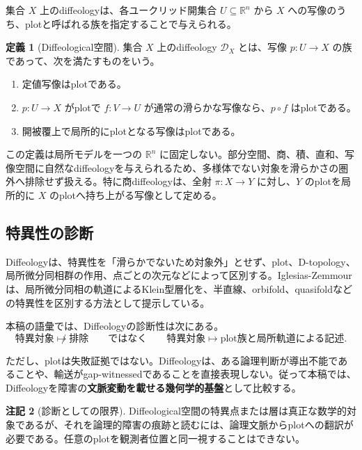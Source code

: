 \documentclass[a4paper,11pt]{ltjsarticle}
\theoremstyle{definition}
\newtheorem{definition}{定義}[section]
\newtheorem{remark}[definition]{注記}
\theoremstyle{plain}
\begin{document}
集合 $X$ 上のdiffeologyは、各ユークリッド開集合 $U\subseteq\mathbb R^n$ から $X$ への写像のうち、plotと呼ばれる族を指定することで与えられる\cite{IglesiasZemmour2013,IglesiasZemmour2025Why}。

\begin{definition}[Diffeological空間]
集合 $X$ 上のdiffeology $\mathcal D_X$ とは、写像 $p:U\to X$ の族であって、次を満たすものをいう。
\begin{enumerate}
 \item 定値写像はplotである。
 \item $p:U\to X$ がplotで $f:V\to U$ が通常の滑らかな写像なら、$p\circ f$ はplotである。
 \item 開被覆上で局所的にplotとなる写像はplotである。
\end{enumerate}
\end{definition}

この定義は局所モデルを一つの $\mathbb R^n$ に固定しない。部分空間、商、積、直和、写像空間に自然なdiffeologyを与えられるため、多様体でない対象を滑らかさの圏外へ排除せず扱える。特に商diffeologyは、全射 $\pi:X\to Y$ に対し、$Y$ のplotを局所的に $X$ のplotへ持ち上がる写像として定める。

\subsection{特異性の診断}

Diffeologyは、特異性を「滑らかでないため対象外」とせず、plot、D-topology、局所微分同相群の作用、点ごとの次元などによって区別する。Iglesias-Zemmourは、局所微分同相の軌道によるKlein型層化を、半直線、orbifold、quasifoldなどの特異性を区別する方法として提示している\cite{IglesiasZemmour2025Why}。

本稿の語彙では、Diffeologyの診断性は次にある。
\begin{equation}
 \text{特異対象}
 \not\longmapsto
 \text{排除}
 \qquad
 \text{ではなく}
 \qquad
 \text{特異対象}
 \longmapsto
 \text{plot族と局所軌道による記述}.
\end{equation}

ただし、plotは失敗証拠ではない。Diffeologyは、ある論理判断が導出不能であることや、輸送がgap-witnessedであることを直接表現しない。従って本稿では、Diffeologyを障害の\textbf{文脈変動を載せる幾何学的基盤}として比較する。

\begin{remark}[診断としての限界]
Diffeological空間の特異点または層は真正な数学的対象であるが、それを論理的障害の痕跡と読むには、論理文脈からplotへの翻訳が必要である。任意のplotを観測者位置と同一視することはできない。
\end{remark}
\end{document}
